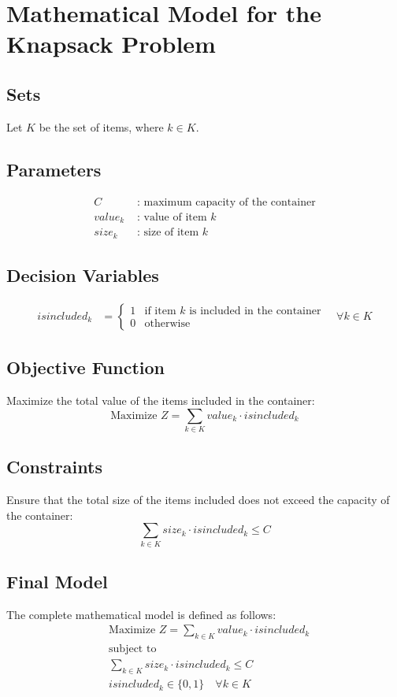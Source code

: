 \documentclass{article}
\begin{document}
\section*{Mathematical Model for the Knapsack Problem}

\subsection*{Sets}
Let \( K \) be the set of items, where \( k \in K \).

\subsection*{Parameters}
\begin{align*}
C & \text{ : maximum capacity of the container} \\
value_k & \text{ : value of item } k \\
size_k & \text{ : size of item } k 
\end{align*}

\subsection*{Decision Variables}
\begin{align*}
isincluded_k & = \begin{cases} 
1 & \text{if item } k \text{ is included in the container} \\
0 & \text{otherwise}
\end{cases} \quad \forall k \in K 
\end{align*}

\subsection*{Objective Function}
Maximize the total value of the items included in the container:
\[
\text{Maximize } Z = \sum_{k \in K} value_k \cdot isincluded_k
\]

\subsection*{Constraints}
Ensure that the total size of the items included does not exceed the capacity of the container:
\[
\sum_{k \in K} size_k \cdot isincluded_k \leq C
\]

\subsection*{Final Model}
The complete mathematical model is defined as follows:
\[
\begin{aligned}
& \text{Maximize } Z = \sum_{k \in K} value_k \cdot isincluded_k \\
& \text{subject to} \\
& \sum_{k \in K} size_k \cdot isincluded_k \leq C \\
& isincluded_k \in \{0, 1\} \quad \forall k \in K 
\end{aligned}
\]
\end{document}
